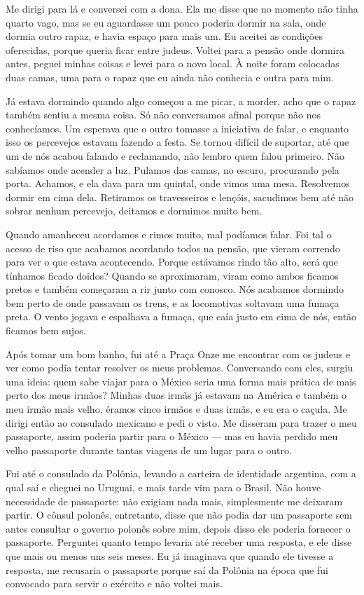 Me dirigi para lá e conversei com a dona. Ela me disse que no
momento não tinha quarto vago, mas se eu aguardasse um
pouco poderia dormir na sala, onde dormia outro rapaz, e havia espaço para mais um. 
Eu aceitei as condições oferecidas, porque
queria ficar entre judeus. Voltei para a pensão onde dormira antes, peguei minhas coisas e levei para o novo local. À noite foram colocadas duas camas, uma para o
rapaz que eu ainda não conhecia e outra para mim.

Já estava dormindo quando algo começou a me picar, a morder, acho que o
rapaz também sentiu a mesma coisa. Só não conversamos afinal porque não nos conhecíamos. Um esperava que o outro tomasse a iniciativa de
falar, e enquanto isso os percevejos estavam fazendo a festa. Se tornou
difícil de suportar, até que um de nós acabou falando e reclamando,
não lembro quem falou primeiro. Não sabíamos onde acender a
luz. Pulamos das camas, no escuro, procurando pela porta.
Achamos, e ela dava para um quintal, onde vimos uma mesa.
Resolvemos dormir em cima dela. Retiramos os travesseiros e lençóis,
sacudimos bem até não sobrar nenhum percevejo, deitamos e dormimos muito
bem.

Quando amanheceu acordamos e rimos muito, mal podíamos falar. Foi tal o
acesso de riso que acabamos acordando todos na pensão, que vieram
correndo para ver o que estava acontecendo. Porque estávamos rindo tão
alto, será que tínhamos ficado doidos? Quando se aproximaram, viram
como ambos ficamos pretos e também começaram a rir junto com conosco.
Nós acabamos dormindo bem perto de onde passavam os trens, e as
locomotivas soltavam uma fumaça preta. O vento jogava e espalhava a
fumaça, que caía justo em cima de nós, então ficamos bem sujos.

Após tomar um bom banho, fui até a Praça Onze me encontrar com os judeus
e ver como podia tentar resolver os meus problemas. Conversando com eles, surgiu
uma ideia: quem sabe viajar para o México seria uma forma mais prática de mais perto dos
meus irmãos? Minhas duas irmãs já estavam na América e também o meu
irmão mais velho, éramos cinco irmãos e duas irmãs, e eu era o caçula.
Me dirigi então ao consulado mexicano e pedi o visto. Me disseram para
trazer o meu passaporte, assim poderia partir para o
México --- mas eu havia perdido meu velho passaporte durante tantas
viagens de um lugar para o outro.

Fui até o consulado da Polônia, levando a carteira de identidade
argentina, com a qual saí e cheguei no Uruguai, e mais tarde vim para o
Brasil. Não houve necessidade de passaporte: não exigiam nada mais,
simplesmente me deixaram partir. O cônsul polonês, entretanto, disse que
não podia dar um passaporte sem antes consultar o governo polonês sobre
mim, depois disso ele poderia fornecer o passaporte.
Perguntei quanto tempo levaria até receber uma resposta, e ele disse
que mais ou menos uns seis meses. Eu já imaginava que quando ele tivesse
a resposta, me recusaria o passaporte porque saí da Polônia na época que
fui convocado para servir o exército e não voltei mais. 


